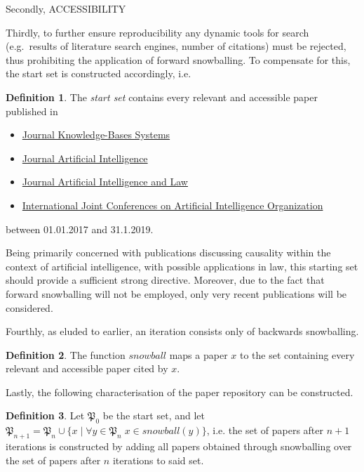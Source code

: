 \documentclass[11pt,a4paper]{book}
\theoremstyle{definition}
\newtheorem{definition}{Definition}[section]
\theoremstyle{definition}
\theoremstyle{definition}
\theoremstyle{remark}
\begin{document}
Secondly, ACCESSIBILITY


Thirdly, to further ensure reproducibility any dynamic tools for search (e.g.\ results of literature search engines, number of citations) must be rejected, thus prohibiting the application of forward snowballing. To compensate for this, the start set is constructed accordingly, i.e.
\begin{definition}
The \emph{start set} contains every relevant and accessible paper published in 
\begin{itemize}
\item \href{https://www.journals.elsevier.com/knowledge-based-systems}{Journal Knowledge-Bases Systems}
\item \href{https://www.journals.elsevier.com/artificial-intelligence}{Journal Artificial Intelligence}
\item \href{https://www.springer.com/journal/10506}{Journal Artificial Intelligence and Law}
\item \href{https://www.ijcai.org/}{International Joint Conferences on Artificial Intelligence Organization}
\end{itemize}
between 01.01.2017 and 31.1.2019.
\end{definition}
Being primarily concerned with publications discussing causality within the context of artificial intelligence, with possible applications in law, this starting set should provide a sufficient strong directive.
Moreover, due to the fact that forward snowballing will not be employed, only very recent publications will be considered.

Fourthly, as eluded to earlier, an iteration consists only of backwards snowballing.
\begin{definition}
The function $\mathit{snowball}$ maps a paper $x$ to the set containing every relevant and accessible paper cited by $x$.
\end{definition}


Lastly, the following characterisation of the paper repository can be constructed.
\begin{definition}
Let $\mathfrak{P}_0$ be the start set, and let $\mathfrak{P}_{n+1}=\mathfrak{P}_{n} \cup \{x \mid \forall y \in \mathfrak{P}_{n} \; x \in \mathit{snowball}(y) \}$, i.e. the set of papers after $n+1$ iterations is constructed by adding all papers obtained through snowballing over the set of papers after $n$ iterations to said set.
\end{definition}

\end{document}
